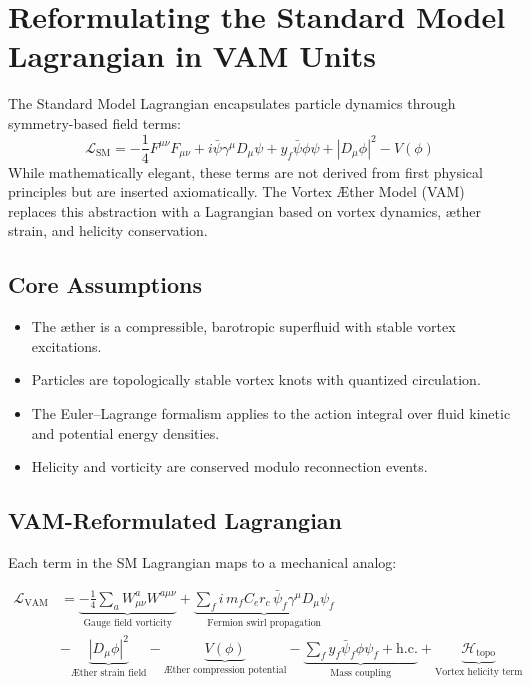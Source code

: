 \section{Reformulating the Standard Model Lagrangian in VAM Units}\label{sec:lagrangian_vam}
The Standard Model Lagrangian encapsulates particle dynamics through symmetry-based field terms:
\begin{equation}
    \mathcal{L}_{\text{SM}} = -\frac{1}{4}F^{\mu\nu}F_{\mu\nu} + i\bar{\psi}\gamma^\mu D_\mu \psi + y_f \bar{\psi}\phi \psi + |D_\mu \phi|^2 - V(\phi)
\end{equation}
While mathematically elegant, these terms are not derived from first physical principles but are inserted axiomatically. The Vortex Æther Model (VAM) replaces this abstraction with a Lagrangian based on vortex dynamics, æther strain, and helicity conservation.

\subsection*{Core Assumptions}
\begin{itemize}
    \item The æther is a compressible, barotropic superfluid with stable vortex excitations.
    \item Particles are topologically stable vortex knots with quantized circulation.
    \item The Euler–Lagrange formalism applies to the action integral over fluid kinetic and potential energy densities.
    \item Helicity and vorticity are conserved modulo reconnection events.
\end{itemize}

\subsection*{VAM-Reformulated Lagrangian}
Each term in the SM Lagrangian maps to a mechanical analog:

\begin{align*}
    \mathcal{L}_\text{VAM} &= \underbrace{-\frac{1}{4} \sum_{a} W^{a}_{\mu\nu} W^{a\mu\nu}}_{\text{Gauge field vorticity}}
    + \underbrace{\sum_{f} i \, m_f C_e r_c \, \bar{\psi}_f \gamma^\mu D_\mu \psi_f}_{\text{Fermion swirl propagation}} \\
    &- \underbrace{|D_\mu \phi|^2}_{\text{Æther strain field}}
    - \underbrace{V(\phi)}_{\text{Æther compression potential}}
    - \underbrace{\sum_f y_f \bar{\psi}_f \phi \psi_f + \text{h.c.}}_{\text{Mass coupling}}
    + \underbrace{\mathcal{H}_\text{topo}}_{\text{Vortex helicity term}}
\end{align*}

